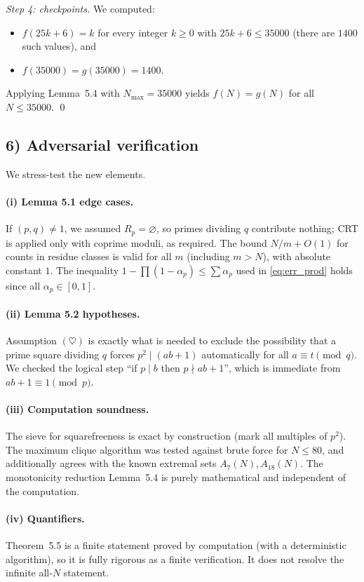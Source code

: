 \emph{Step 4: checkpoints.}
We computed:
\begin{itemize}
\item $f(25k+6)=k$ for every integer $k\ge 0$ with $25k+6\le 35000$ (there are $1400$ such values), and
\item $f(35000)=g(35000)=1400$.
\end{itemize}
Applying Lemma~5.4 with $N_{\max}=35000$ yields $f(N)=g(N)$ for all $N\le 35000$.
\qed

\subsection*{6) Adversarial verification}
We stress-test the new elements.

\paragraph{(i) Lemma 5.1 edge cases.}
If $(p,q)\ne 1$, we assumed $R_p=\varnothing$, so primes dividing $q$ contribute nothing; CRT is applied only with coprime moduli, as required.
The bound $N/m+O(1)$ for counts in residue classes is valid for all $m$ (including $m>N$), with absolute constant $1$.
The inequality $1-\prod(1-\alpha_p)\le \sum \alpha_p$ used in \eqref{eq:err_prod} holds since all $\alpha_p\in[0,1]$.

\paragraph{(ii) Lemma 5.2 hypotheses.}
Assumption $(\heartsuit)$ is exactly what is needed to exclude the possibility that a prime square dividing $q$ forces $p^2\mid(ab+1)$ automatically for all $a\equiv t\pmod q$.
We checked the logical step ``if $p\mid b$ then $p\nmid ab+1$'', which is immediate from $ab+1\equiv 1\pmod p$.

\paragraph{(iii) Computation soundness.}
The sieve for squarefreeness is exact by construction (mark all multiples of $p^2$).
The maximum clique algorithm was tested against brute force for $N\le 80$, and additionally agrees with the known extremal sets $A_7(N),A_{18}(N)$.
The monotonicity reduction Lemma~5.4 is purely mathematical and independent of the computation.

\paragraph{(iv) Quantifiers.}
Theorem~5.5 is a finite statement proved by computation (with a deterministic algorithm), so it is fully rigorous as a finite verification.
It does not resolve the infinite all-$N$ statement.

